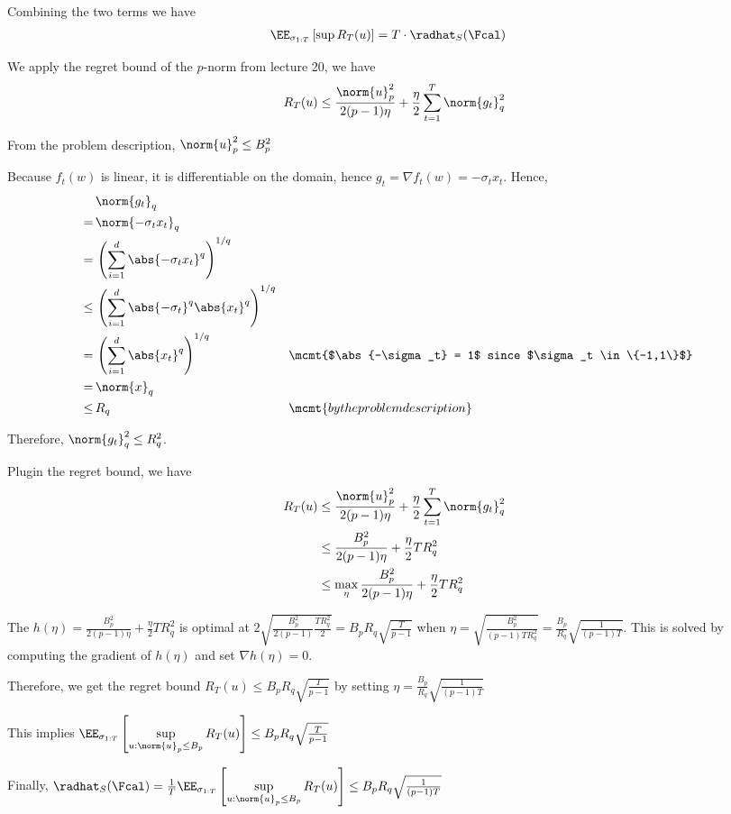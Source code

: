 Combining the two terms we have
\begin{align*}
  &\displaystyle \EE_{\sigma_{1:T}}\left[ \sup R_T(u) \right] = T \cdot \radhat_S(\Fcal)
\end{align*}

We apply the regret bound of the $p$-norm from lecture 20, we have
\begin{align*}
  R_T(u) \le \frac{\norm{u}_p^2}{2(p-1)\eta} + \frac{\eta}{2}\sum_{t=1}^T\norm{g_t}_q^2
\end{align*}

From the problem description, $\norm{u}_p^2 \le B_p^2$ 

Because $f_t(w)$ is linear, it is differentiable on the domain, hence $g_t = \nabla f_t(w) = -\sigma_t x_t$. Hence,
\begin{align*}
  &\norm{g_t}_q \\
  =\,&\norm{-\sigma_t x_t}_q \\
  =\,&\left(\sum_{i=1}^d\abs{-\sigma_t x_t}^q\right)^{1/q} \\
  \le\,&\left(\sum_{i=1}^d\abs{-\sigma_t}^q\abs{ x_t}^q\right)^{1/q} \\
  =\,&\left(\sum_{i=1}^d\abs{ x_t}^q\right)^{1/q} && \mcmt{$\abs{-\sigma_t} = 1$ since $\sigma_t \in \{-1,1\}$}\\
  =\,&\norm{x}_q \\
  \le\,& R_q && \mcmt{by the problem description}
\end{align*}

Therefore, $\norm{g_t}_q^2 \le R_q^2$.

Plugin the regret bound, we have
\begin{align*}
  R_T(u)
  &\le \frac{\norm{u}_p^2}{2(p-1)\eta} + \frac{\eta}{2}\sum_{t=1}^T\norm{g_t}_q^2 \\
  &\le \frac{B_p^2}{2(p-1)\eta} + \frac{\eta}{2}TR_q^2 \\
  &\le \max_{\eta} \frac{B_p^2}{2(p-1)\eta} + \frac{\eta}{2}TR_q^2
\end{align*}

The $h(\eta) = \frac{B_p^2}{2(p-1)\eta} + \frac{\eta}{2}TR_q^2$ is optimal at $2\sqrt{\frac{B_p^2}{2(p-1)} \frac{TR_q^2}{2}} = B_pR_q\sqrt{\frac{T}{p-1}}$ when $\eta = \sqrt{\frac{B_p^2}{(p-1)TR_q^2}} = \frac{B_p}{R_q}\sqrt{\frac{1}{(p-1)T}}$. This is solved by computing the gradient of $h(\eta)$ and set $\nabla h(\eta) = 0$.

Therefore, we get the regret bound $R_T(u) \le B_pR_q\sqrt{\frac{T}{p-1}}$ by setting $\eta = \frac{B_p}{R_q}\sqrt{\frac{1}{(p-1)T}}$

This implies $\EE_{\sigma_{1:T}}\left[ \displaystyle \sup_{u: \norm{u}_p \le B_p} R_T(u) \right] \le B_pR_q\sqrt{\frac{T}{p-1}}$

Finally, $\radhat_S(\Fcal) = \frac{1}{T}\EE_{\sigma_{1:T}}\left[ \displaystyle \sup_{u: \norm{u}_p \le B_p} R_T(u) \right] \le B_pR_q\sqrt{\frac{1}{(p-1)T}} $
